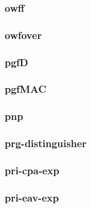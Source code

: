 \begin{frame}\frametitle{owff}
\begin{figure}
\begin{center}

\end{center}
\end{figure}
\end{frame}
\begin{frame}\frametitle{owfover}
\begin{figure}
\begin{center}

\end{center}
\end{figure}
\end{frame}
\begin{frame}\frametitle{pgfD}
\begin{figure}
\begin{center}

\end{center}
\end{figure}
\end{frame}
\begin{frame}\frametitle{pgfMAC}
\begin{figure}
\begin{center}

\end{center}
\end{figure}
\end{frame}
\begin{frame}\frametitle{pnp}
\begin{figure}
\begin{center}

\end{center}
\end{figure}
\end{frame}
\begin{frame}\frametitle{prg-distinguisher}
\begin{figure}
\begin{center}

\end{center}
\end{figure}
\end{frame}
\begin{frame}\frametitle{pri-cpa-exp}
\begin{figure}
\begin{center}

\end{center}
\end{figure}
\end{frame}
\begin{frame}\frametitle{pri-eav-exp}
\begin{figure}
\begin{center}

\end{center}
\end{figure}
\end{frame}
